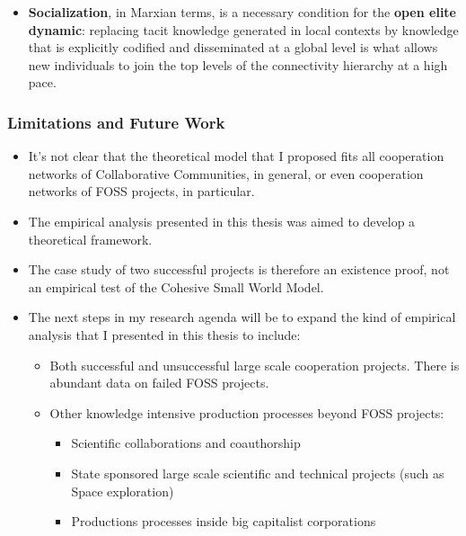 \documentclass[ignorenonframetext,red,8pt,notes=hide]{beamer}
\begin{document}
\begin{frame}
\begin{itemize}
\item \textbf{Socialization}, in Marxian terms, is a necessary condition for the \textbf{open elite dynamic}: replacing tacit knowledge generated in local contexts by knowledge that is explicitly codified and disseminated at a global level is what allows new individuals to join the top levels of the connectivity hierarchy at a high pace.

\end{itemize}

\end{frame}


\begin{frame}
\frametitle{Limitations and Future Work}

\begin{itemize}

\item It's not clear that the theoretical model that I proposed fits all cooperation networks of Collaborative Communities, in general, or even cooperation networks of FOSS projects, in particular.

\item The empirical analysis presented in this thesis was aimed to develop a theoretical framework.

\item The case study of two successful projects is therefore an existence proof, not an empirical test of the Cohesive Small World Model.

\item The next steps in my research agenda will be to expand the kind of empirical analysis that I presented in this thesis to include:

\begin{itemize}
\item Both successful and unsuccessful large scale cooperation projects. There is abundant data on failed FOSS projects.

\item Other knowledge intensive production processes beyond FOSS projects:

\begin{itemize}
\item Scientific collaborations and coauthorship
\item State sponsored large scale scientific and technical projects (such as Space exploration)
\item Productions processes inside big capitalist corporations  
\end{itemize}
\end{itemize}
\end{itemize}

\end{frame}
\end{document}
